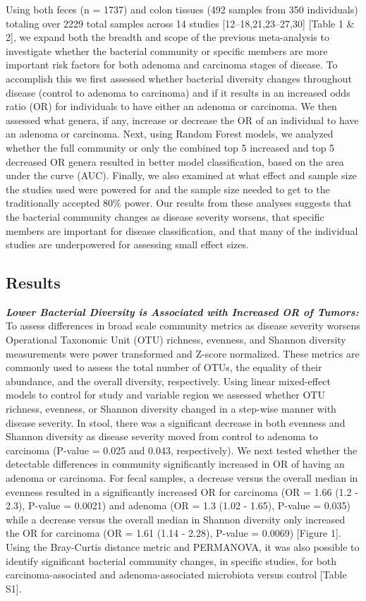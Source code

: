 \documentclass[12pt,]{article}
\begin{document}
Using both feces (n = 1737) and colon tissues (492 samples from 350
individuals) totaling over 2229 total samples across 14 studies
{[}12--18,21,23--27,30{]} {[}Table 1 \& 2{]}, we expand both the breadth
and scope of the previous meta-analysis to investigate whether the
bacterial community or specific members are more important risk factors
for both adenoma and carcinoma stages of disease. To accomplish this we
first assessed whether bacterial diversity changes throughout disease
(control to adenoma to carcinoma) and if it results in an increased odds
ratio (OR) for individuals to have either an adenoma or carcinoma. We
then assessed what genera, if any, increase or decrease the OR of an
individual to have an adenoma or carcinoma. Next, using Random Forest
models, we analyzed whether the full community or only the combined top
5 increased and top 5 decreased OR genera resulted in better model
classification, based on the area under the curve (AUC). Finally, we
also examined at what effect and sample size the studies used were
powered for and the sample size needed to get to the traditionally
accepted 80\% power. Our results from these analyses suggests that the
bacterial community changes as disease severity worsens, that specific
members are important for disease classification, and that many of the
individual studies are underpowered for assessing small effect sizes.

\newpage

\subsection{Results}\label{results}

\textbf{\emph{Lower Bacterial Diversity is Associated with Increased OR
of Tumors:}} To assess differences in broad scale community metrics as
disease severity worsens Operational Taxonomic Unit (OTU) richness,
evenness, and Shannon diversity measurements were power transformed and
Z-score normalized. These metrics are commonly used to assess the total
number of OTUs, the equality of their abundance, and the overall
diversity, respectively. Using linear mixed-effect models to control for
study and variable region we assessed whether OTU richness, evenness, or
Shannon diversity changed in a step-wise manner with disease severity.
In stool, there was a significant decrease in both evenness and Shannon
diversity as disease severity moved from control to adenoma to carcinoma
(P-value = 0.025 and 0.043, respectively). We next tested whether the
detectable differences in community significantly increased in OR of
having an adenoma or carcinoma. For fecal samples, a decrease versus the
overall median in evenness resulted in a significantly increased OR for
carcinoma (OR = 1.66 (1.2 - 2.3), P-value = 0.0021) and adenoma (OR =
1.3 (1.02 - 1.65), P-value = 0.035) while a decrease versus the overall
median in Shannon diversity only increased the OR for carcinoma (OR =
1.61 (1.14 - 2.28), P-value = 0.0069) {[}Figure 1{]}. Using the
Bray-Curtis distance metric and PERMANOVA, it was also possible to
identify significant bacterial community changes, in specific studies,
for both carcinoma-associated and adenoma-associated microbiota versus
control {[}Table S1{]}.
\end{document}
